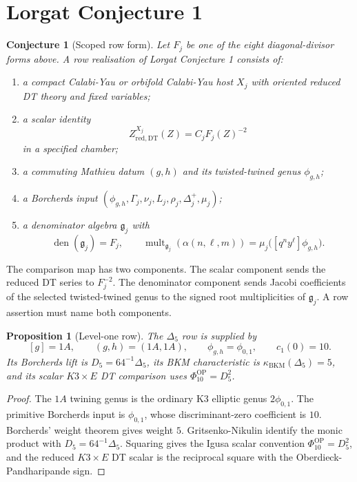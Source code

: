 \documentclass[11pt]{article}
\newtheorem{proposition}[theorem]{Proposition}
\newtheorem{conjecture}[theorem]{Conjecture}
\providecommand{\DT}{\mathrm{DT}}
\providecommand{\red}{\mathrm{red}}
\providecommand{\mult}{\operatorname{mult}}
\providecommand{\kBKM}{\kappa_{\mathrm{BKM}}}
\providecommand{\fg}{\mathfrak{g}}
\providecommand{\Dfive}{\Delta_5}
\providecommand{\Phiten}{\Phi_{10}}
\providecommand{\fone}{\phi_{0,1}}
\begin{document}
\section{Lorgat Conjecture 1}

\begin{conjecture}[Scoped row form]
Let \(F_j\) be one of the eight diagonal-divisor forms above.  A row
realisation of Lorgat Conjecture 1 consists of:
\begin{enumerate}[label=(\roman*)]
\item a compact Calabi-Yau or orbifold Calabi-Yau host \(X_j\) with
oriented reduced DT theory and fixed variables;
\item a scalar identity
\[
  Z_{\red,\DT}^{X_j}(Z)=C_jF_j(Z)^{-2}
\]
in a specified chamber;
\item a commuting Mathieu datum \((g,h)\) and its twisted-twined genus
\(\phi_{g,h}\);
\item a Borcherds input
\((\phi_{g,h},\Gamma_j,\nu_j,L_j,\rho_j,\Delta_j^+,\mu_j)\);
\item a denominator algebra \(\fg_j\) with
\[
  \operatorname{den}(\fg_j)=F_j,\qquad
  \mult_{\fg_j}(\alpha(n,\ell,m))
  =\mu_j\bigl([q^ny^\ell]\phi_{g,h}\bigr).
\]
\end{enumerate}
\end{conjecture}

The comparison map has two components.  The scalar component sends the
reduced DT series to \(F_j^{-2}\).  The denominator component sends
Jacobi coefficients of the selected twisted-twined genus to the signed
root multiplicities of \(\fg_j\).  A row assertion must name both
components.

\begin{proposition}[Level-one row]
The \(\Dfive\) row is supplied by
\[
  [g]=1A,\qquad (g,h)=(1A,1A),\qquad
  \phi_{g,h}=\fone,\qquad c_1(0)=10.
\]
Its Borcherds lift is \(D_5=64^{-1}\Dfive\), its BKM characteristic is
\(\kBKM(\Dfive)=5\), and its scalar \(K3\times E\) DT comparison uses
\(\Phiten^{\mathrm{OP}}=D_5^2\).
\end{proposition}

\begin{proof}
The \(1A\) twining genus is the ordinary K3 elliptic genus
\(2\fone\).  The primitive Borcherds input is \(\fone\), whose
discriminant-zero coefficient is \(10\).  Borcherds' weight theorem
gives weight \(5\).  Gritsenko-Nikulin identify the monic product with
\(D_5=64^{-1}\Dfive\).  Squaring gives the Igusa scalar convention
\(\Phiten^{\mathrm{OP}}=D_5^2\), and the reduced \(K3\times E\)
DT scalar is the reciprocal square with the Oberdieck-Pandharipande
sign.
\end{proof}
\end{document}
